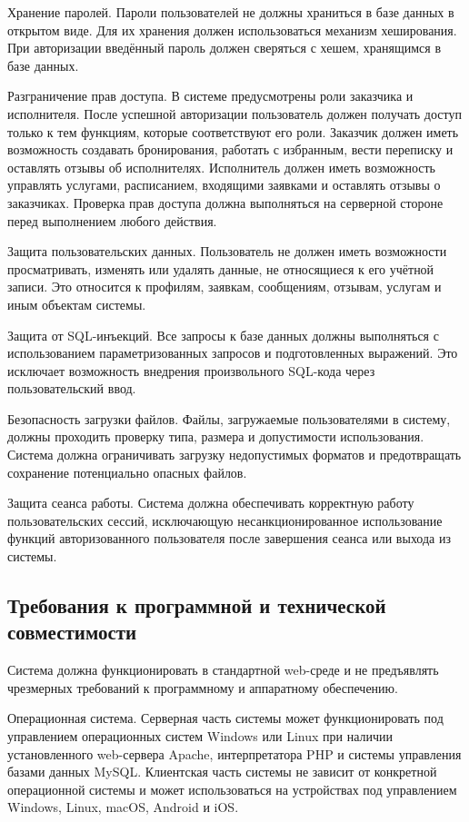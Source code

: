 Хранение паролей.  
Пароли пользователей не должны храниться в базе данных в открытом виде. Для их хранения должен использоваться механизм хеширования. При авторизации введённый пароль должен сверяться с хешем, хранящимся в базе данных.

Разграничение прав доступа.  
В системе предусмотрены роли заказчика и исполнителя. После успешной авторизации пользователь должен получать доступ только к тем функциям, которые соответствуют его роли. Заказчик должен иметь возможность создавать бронирования, работать с избранным, вести переписку и оставлять отзывы об исполнителях. Исполнитель должен иметь возможность управлять услугами, расписанием, входящими заявками и оставлять отзывы о заказчиках. Проверка прав доступа должна выполняться на серверной стороне перед выполнением любого действия.

Защита пользовательских данных.  
Пользователь не должен иметь возможности просматривать, изменять или удалять данные, не относящиеся к его учётной записи. Это относится к профилям, заявкам, сообщениям, отзывам, услугам и иным объектам системы.

Защита от SQL-инъекций.  
Все запросы к базе данных должны выполняться с использованием параметризованных запросов и подготовленных выражений. Это исключает возможность внедрения произвольного SQL-кода через пользовательский ввод.

Безопасность загрузки файлов.  
Файлы, загружаемые пользователями в систему, должны проходить проверку типа, размера и допустимости использования. Система должна ограничивать загрузку недопустимых форматов и предотвращать сохранение потенциально опасных файлов.

Защита сеанса работы.  
Система должна обеспечивать корректную работу пользовательских сессий, исключающую несанкционированное использование функций авторизованного пользователя после завершения сеанса или выхода из системы.

\subsection{Требования к программной и технической совместимости}

Система должна функционировать в стандартной web-среде и не предъявлять чрезмерных требований к программному и аппаратному обеспечению.

Операционная система.  
Серверная часть системы может функционировать под управлением операционных систем Windows или Linux при наличии установленного web-сервера Apache, интерпретатора PHP и системы управления базами данных MySQL. Клиентская часть системы не зависит от конкретной операционной системы и может использоваться на устройствах под управлением Windows, Linux, macOS, Android и iOS.

